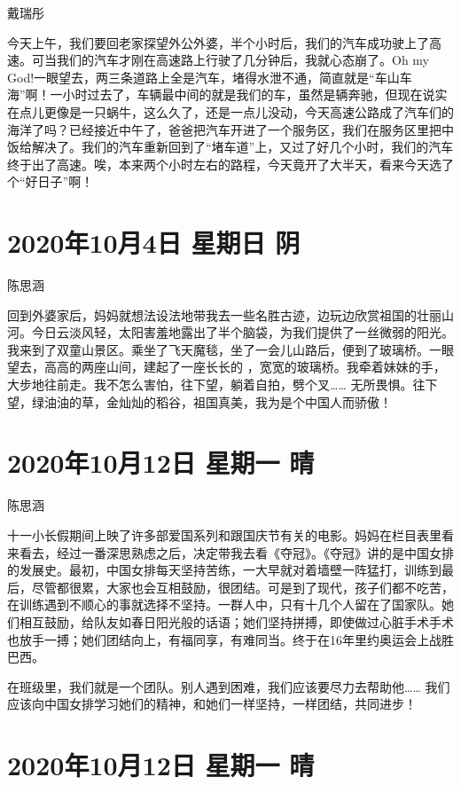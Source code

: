 戴瑞彤

今天上午，我们要回老家探望外公外婆，半个小时后，我们的汽车成功驶上了高速。可当我们的汽车才刚在高速路上行驶了几分钟后，我就心态崩了。Oh my God!一眼望去，两三条道路上全是汽车，堵得水泄不通，简直就是“车山车海”啊！一小时过去了，车辆最中间的就是我们的车，虽然是辆奔驰，但现在说实在点儿更像是一只蜗牛，这么久了，还是一点儿没动，今天高速公路成了汽车们的海洋了吗？已经接近中午了，爸爸把汽车开进了一个服务区，我们在服务区里把中饭给解决了。我们的汽车重新回到了“堵车道”上，又过了好几个小时，我们的汽车终于出了高速。唉，本来两个小时左右的路程，今天竟开了大半天，看来今天选了个“好日子”啊！

\section{2020年10月4日 星期日 阴}

陈思涵

回到外婆家后，妈妈就想法设法地带我去一些名胜古迹，边玩边欣赏祖国的壮丽山河。今日云淡风轻，太阳害羞地露出了半个脑袋，为我们提供了一丝微弱的阳光。我来到了双童山景区。乘坐了飞天魔毯，坐了一会儿山路后，便到了玻璃桥。一眼望去，高高的两座山间，建起了一座长长的
，宽宽的玻璃桥。我牵着妹妹的手，大步地往前走。我不怎么害怕，往下望，躺着自拍，劈个叉…… 无所畏惧。往下望，绿油油的草，金灿灿的稻谷，祖国真美，我为是个中国人而骄傲！

\section{2020年10月12日 星期一 晴}

陈思涵

十一小长假期间上映了许多部爱国系列和跟国庆节有关的电影。妈妈在栏目表里看来看去，经过一番深思熟虑之后，决定带我去看《夺冠》。《夺冠》讲的是中国女排的发展史。最初，中国女排每天坚持苦练，一大早就对着墙壁一阵猛打，训练到最后，尽管都很累，大家也会互相鼓励，很团结。可是到了现代，孩子们都不吃苦，在训练遇到不顺心的事就选择不坚持。一群人中，只有十几个人留在了国家队。她们相互鼓励，给队友如春日阳光般的话语；她们坚持拼搏，即使做过心脏手术手术也放手一搏；她们团结向上，有福同享，有难同当。终于在16年里约奥运会上战胜巴西。

在班级里，我们就是一个团队。别人遇到困难，我们应该要尽力去帮助他…… 我们应该向中国女排学习她们的精神，和她们一样坚持，一样团结，共同进步！

\section{2020年10月12日 星期一 晴}

